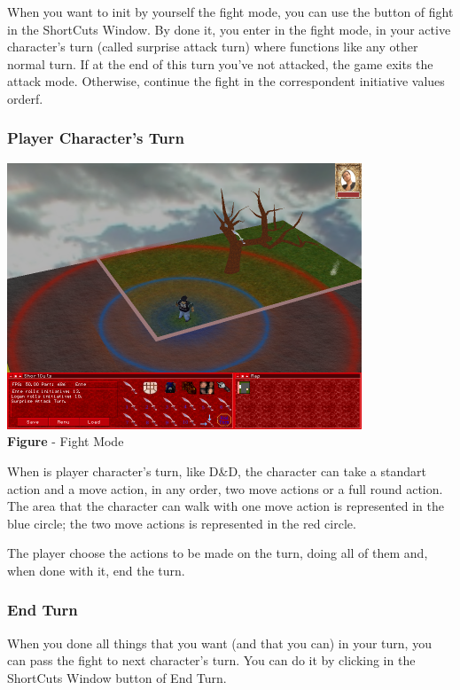 \documentclass[ letterpaper,12pt]{article}
\begin{document}
When you want to init by yourself the fight mode, you can use the button of fight in the ShortCuts Window. By done it, you enter in the fight mode, in your active character's turn (called surprise attack turn) where functions like any other normal turn. If at the end of this turn you've not attacked, the game exits the attack mode. Otherwise, continue the fight in the  correspondent initiative values orderf.

\subsubsection{Player Character's Turn}

\begin{center}
  \includegraphics{fightMode.png}
\\{\bf Figure} - Fight Mode
\end{center}

When is player character's turn, like D\&D, the character can take a standart action and a move action, in any order, two move actions or a full round action. The area that the character can walk with one move action is represented in the blue circle; the two move actions is represented in the red circle.

The player choose the actions to be made on the turn, doing all of them and, when done with it, end the turn.

\subsubsection{End Turn}

When you done all things that you want (and that you can) in your turn, you can pass the fight to next character's turn. You can do it by clicking in the ShortCuts Window button of End Turn.
\end{document}
